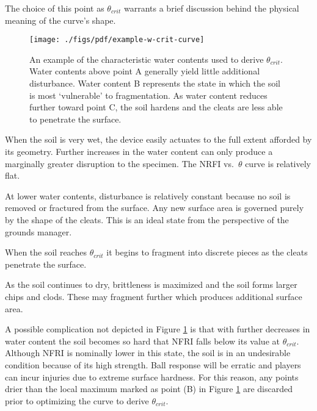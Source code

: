 \documentclass[
  letterpaper,
  openany]{book}
\begin{document}
The choice of this point as \(\theta_{crit}\) warrants a brief discussion behind the physical meaning of the curve's shape.

\begin{figure}

{\centering \texttt{[image: ./figs/pdf/example-w-crit-curve]} 

}

\caption[Conceptual stages of infield soil behavior with reducing $\theta$]{An example of the characteristic water contents used to derive \(\theta_{crit}\). Water contents above point A generally yield little additional disturbance. Water content B represents the state in which the soil is most `vulnerable' to fragmentation. As water content reduces further toward point C, the soil hardens and the cleats are less able to penetrate the surface.}\label{fig:example-nrfi-vs-water-content-curve}
\end{figure}

When the soil is very wet, the device easily actuates to the full extent afforded by its geometry.
Further increases in the water content can only produce a marginally greater disruption to the specimen. The NRFI vs.~\(\theta\) curve is relatively flat.

At lower water contents, disturbance is relatively constant because no soil is removed or fractured from the surface.
Any new surface area is governed purely by the shape of the cleats.
This is an ideal state from the perspective of the grounds manager.

When the soil reaches \(\theta_{crit}\) it begins to fragment into discrete pieces as the cleats penetrate the surface.

As the soil continues to dry, brittleness is maximized and the soil forms larger chips and clods.
These may fragment further which produces additional surface area.

A possible complication not depicted in Figure \ref{fig:example-nrfi-vs-water-content-curve} is that with further decreases in water content the soil becomes so hard that NFRI falls below its value at \(\theta_{crit}\).
Although NFRI is nominally lower in this state, the soil is in an undesirable condition because of its high strength.
Ball response will be erratic and players can incur injuries due to extreme surface hardness.
For this reason, any points drier than the local maximum marked as point (B) in Figure \ref{fig:example-nrfi-vs-water-content-curve} are discarded prior to optimizing the curve to derive \(\theta_{crit}\).
\end{document}
